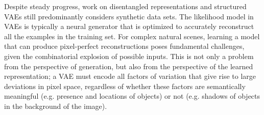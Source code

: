 \documentclass{article}
\begin{document}
Despite steady progress, work on disentangled representations and structured VAEs still predominantly considers synthetic data sets. The likelihood model in VAEs is typically a neural generator that is optimized to accurately reconstruct all the examples in the training set. For complex natural scenes, learning a model that can produce pixel-perfect reconstructions poses fundamental challenges, given the combinatorial explosion of possible inputs. This is not only a problem from the perspective of generation, but also from the perspective of the learned representation; a VAE must encode all factors of variation that give rise to large deviations in pixel space, regardless of whether these factors are semantically meaningful (e.g. presence and locations of objects) or not (e.g. shadows of objects in the background of the image).




\end{document}
